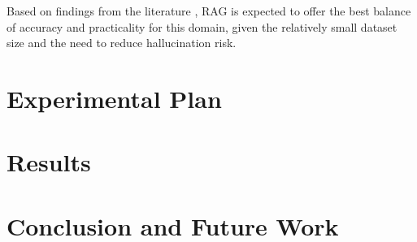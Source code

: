 \documentclass[11pt]{article}
\begin{document}
Based on findings from the literature \cite{akhtar2025llmbasedeventloganalysis}, RAG is expected to offer the best balance of accuracy and practicality for this domain, given the relatively small dataset size and the need to reduce hallucination risk.

\section{Experimental Plan}
\label{sec:experiments}


\section{Results}
\label{sec:results}



\section{Conclusion and Future Work}
\label{sec:conclusion}
\end{document}
